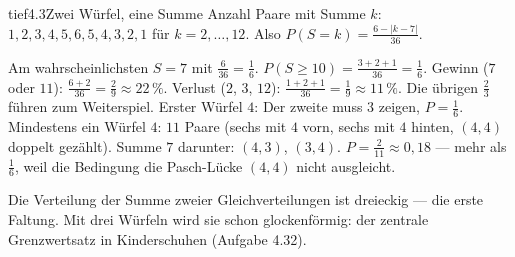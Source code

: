 \begin{loesungkarte}{tief}{4.3}{Zwei Würfel, eine Summe}
Anzahl Paare mit Summe $k$: $1, 2, 3, 4, 5, 6, 5, 4, 3, 2, 1$ für $k = 2, \dots, 12$. Also $P(S = k) = \frac{6 - |k - 7|}{36}$.
\begin{center}
\end{center}
Am wahrscheinlichsten $S = 7$ mit $\frac6{36} = \frac16$. $P(S\ge10) = \frac{3 + 2 + 1}{36} = \frac16$.
Gewinn ($7$ oder $11$): $\frac{6 + 2}{36} = \frac29\approx22\,\%$. Verlust ($2$, $3$, $12$): $\frac{1 + 2 + 1}{36} = \frac19\approx11\,\%$. Die übrigen $\frac23$ führen zum Weiterspiel.
Erster Würfel $4$: Der zweite muss $3$ zeigen, $P = \frac16$. Mindestens ein Würfel $4$: $11$ Paare (sechs mit $4$ vorn, sechs mit $4$ hinten, $(4, 4)$ doppelt gezählt). Summe $7$ darunter: $(4, 3)$, $(3, 4)$. $P = \frac2{11}\approx0{,}18$ --- mehr als $\frac16$, weil die Bedingung die Pasch-Lücke $(4, 4)$ nicht ausgleicht.
\begin{mitnehmen}\kastentext
Die Verteilung der Summe zweier Gleichverteilungen ist dreieckig --- die erste Faltung. Mit drei Würfeln wird sie schon glockenförmig: der zentrale Grenzwertsatz in Kinderschuhen (Aufgabe 4.32).
\end{mitnehmen}
\end{loesungkarte}

